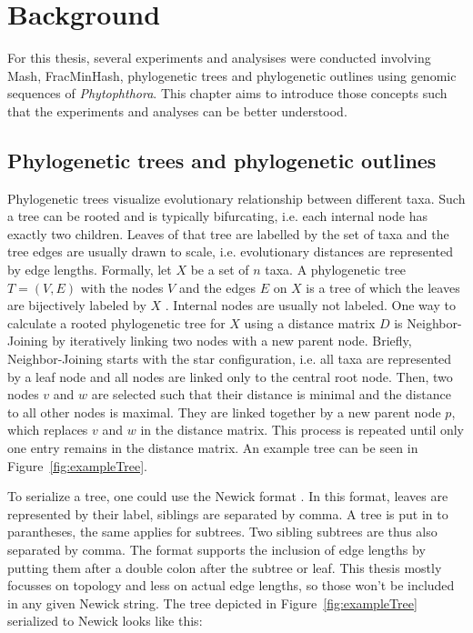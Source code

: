 
\chapter{Background}
  \label{sec:background}

For this thesis, several experiments and analysises were conducted involving
Mash, FracMinHash, phylogenetic trees and phylogenetic outlines using genomic
sequences of \textit{Phytophthora}. This chapter aims to introduce those
concepts such that the experiments and analyses can be better understood.

\section{Phylogenetic trees and phylogenetic outlines}
Phylogenetic trees visualize evolutionary relationship between different taxa.
Such a tree can be rooted and is typically bifurcating, i.e. each internal node
has exactly two children. Leaves of that tree are labelled by the set of taxa
and the tree edges are usually drawn to scale, i.e. evolutionary distances are
represented by edge lengths. Formally, let $X$ be a set of $n$ taxa. A
phylogenetic tree $T = (V, E)$ with the nodes $V$ and the edges $E$ on $X$ is a
tree of which the leaves are bijectively labeled by $X$
\cite{scornavaccaPhylogeneticTrees2010}. Internal nodes are usually not labeled.
One way to calculate a rooted phylogenetic tree for $X$ using a distance matrix
$D$ is Neighbor-Joining \cite{saitouNeighborjoiningMethodNew1987} by iteratively
linking two nodes with a new parent node. Briefly, Neighbor-Joining starts with
the star configuration, i.e. all taxa are represented by a leaf node and all
nodes are linked only to the central root node. Then, two nodes $v$ and $w$ are
selected such that their distance is minimal and the distance to all other nodes
is maximal. They are linked together by a new parent node $p$, which replaces
$v$ and $w$ in the distance matrix. This process is repeated until only one
entry remains in the distance matrix. An example tree can be seen in
Figure~\ref{fig:exampleTree}.

To serialize a tree, one could use the Newick format
\cite{pavlopoulosReferenceGuideTree2010}. In this format, leaves are represented
by their label, siblings are separated by comma. A tree is put in to
parantheses, the same applies for subtrees. Two sibling subtrees are thus also
separated by comma. The format supports the inclusion of edge lengths by putting
them after a double colon after the subtree or leaf. This thesis mostly focusses
on topology and less on actual edge lengths, so those won't be included in any
given Newick string. The tree depicted in Figure~\ref{fig:exampleTree}
serialized to Newick looks like this:

